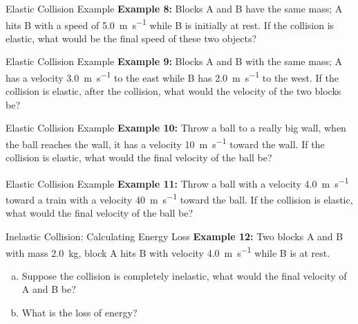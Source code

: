 \documentclass[12pt,compress,aspectratio=169]{beamer}
\begin{document}
\begin{frame}{Elastic Collision Example}
  \textbf{Example 8:} Blocks A and B have the same mass; A hits B with a speed
  of \SI{5.0}{\metre\per\second} while B is initially at rest. If the collision
  is elastic, what would be the final speed of these two objects?
\end{frame}



\begin{frame}{Elastic Collision Example}
  \textbf{Example 9:} Blocks A and B with the same mass; A has a velocity
  \SI{3.0}{\metre\per\second} to the east while B has
  \SI{2.0}{\metre\per\second} to the west. If the collision is elastic, after
  the collision, what would the velocity of the two blocks be?
\end{frame}



\begin{frame}{Elastic Collision Example}
  \textbf{Example 10:} Throw a ball to a really big wall, when the ball reaches
  the wall, it has a velocity \SI{10}{\metre\per\second} toward the wall. If
  the collision is elastic, what would the final velocity of the ball be?
\end{frame}



\begin{frame}{Elastic Collision Example}
  \textbf{Example 11:} Throw a ball with a velocity \SI{4.0}{\metre\per\second}
  toward a train with a velocity \SI{40}{\metre\per\second} toward the ball.
  If the collision is elastic, what would the final velocity of the ball be?
\end{frame}


\begin{frame}{Inelastic Collision: Calculating Energy Loss}
  \textbf{Example 12:} Two blocks A and B with mass \SI{2.0}{\kilo\gram}, block
  A hits B with velocity \SI{4.0}{\metre\per\second} while B is at rest.
  \begin{enumerate}[(a)]
  \item Suppose the collision is completely inelastic, what would the final
    velocity of A and B be?
  \item What is the loss of energy?
  \end{enumerate}
\end{frame}
\end{document}
